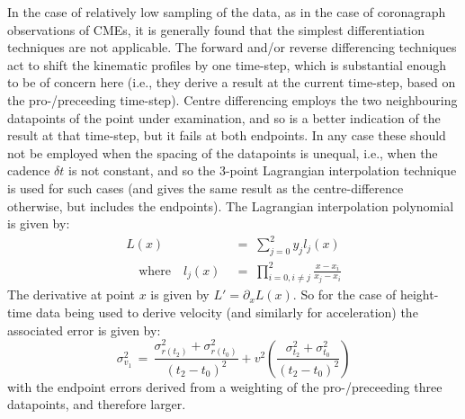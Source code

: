 \documentclass[preprint2]{aastex}
\begin{document}
In the case of relatively low sampling of the data, as in the case of coronagraph observations of CMEs, it is generally found that the simplest differentiation techniques are not applicable. The forward and/or reverse differencing techniques act to shift the kinematic profiles by one time-step, which is substantial enough to be of concern here (i.e., they derive a result at the current time-step, based on the pro-/preceeding time-step). Centre differencing employs the two neighbouring datapoints of the point under examination, and so is a better indication of the result at that time-step, but it fails at both endpoints. In any case these should not be employed when the spacing of the datapoints is unequal, i.e., when the cadence $\delta t$ is not constant, and so the 3-point Lagrangian interpolation technique is used for such cases (and gives the same result as the centre-difference otherwise, but includes the endpoints). The Lagrangian interpolation polynomial is given by:
\begin{eqnarray}
L(x) \; &=\; \sum_{j=0}^2 y_j l_j(x) \\ \quad \mbox{where} \quad
l_j(x) \; &=\; \prod_{i=0, i\neq j}^2 \frac{x-x_i}{x_j-x_i} 
\end{eqnarray}
The derivative at point $x$ is given by $L'=\partial_x L(x)$. So for the case of height-time data being used to derive velocity (and similarly for acceleration) the associated error is given by:
\begin{equation}
\sigma_{v_1}^2 \,=\, \frac{\sigma_{r(t_2)}^2+\sigma_{r(t_0)}^2}{(t_2-t_0)^2} + v^2 \left( \frac{\sigma_{t_2}^2+\sigma_{t_0}^2}{(t_2-t_0)^2} \right)
\label{vel_err}
\end{equation}
with the endpoint errors derived from a weighting of the pro-/preceeding three datapoints, and therefore larger.
\end{document}
